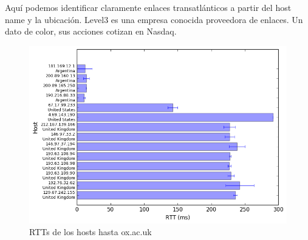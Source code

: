 Aquí podemos identificar claramente enlaces transatlánticos a partir del host name y la ubicación. Level3 es una empresa conocida proveedora de enlaces. Un dato de color, sus acciones cotizan en Nasdaq.

\begin{figure}[H]
\caption{RTTs de los hosts hasta ox.ac.uk}
\includegraphics[width=\textwidth,keepaspectratio]{images/oxford.png}
\end{figure}

